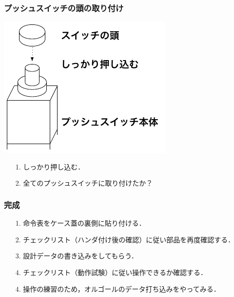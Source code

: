 \documentclass{beamer}                 %
\begin{document}
\begin{frame}
  \frametitle{プッシュスイッチの頭の取り付け}
  \vfill
  \centerline{\includegraphics[scale=0.8]{../Tikz/atama.pdf}}
  \vfill
  \begin{enumerate}
    \item[1.] しっかり押し込む．
    \item[2.] 全てのプッシュスイッチに取り付けたか？
  \end{enumerate}
  \vfill
\end{frame}

\begin{frame}
  \frametitle{完成}
  \begin{enumerate}
    \item[1.] 命令表をケース蓋の裏側に貼り付ける．
    \item[2.] チェックリスト（ハンダ付け後の確認）に従い部品を再度確認する．
    \item[3.] 設計データの書き込みをしてもらう．
    \item[4.] チェックリスト（動作試験）に従い操作できるか確認する．
    \item[4.] 操作の練習のため，オルゴールのデータ打ち込みをやってみる．
  \end{enumerate}
  \vfill
\end{frame}

\end{document}
